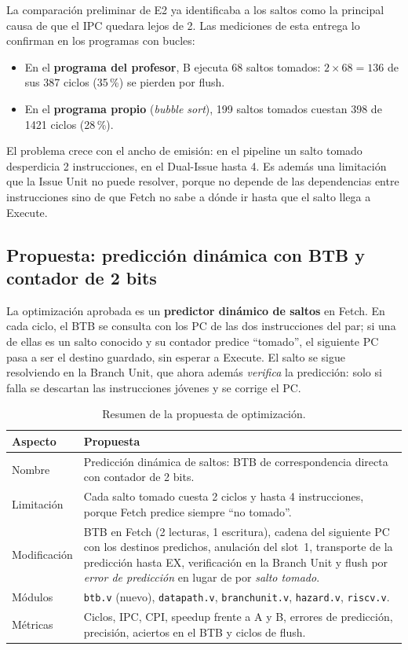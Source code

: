 \documentclass[12pt,a4paper]{article}
\begin{document}
La comparación preliminar de E2 ya identificaba a los saltos como la principal causa de que el IPC quedara lejos de 2. Las mediciones de esta entrega lo confirman en los programas con bucles:

\begin{itemize}
    \item En el \textbf{programa del profesor}, B ejecuta 68 saltos tomados: $2 \times 68 = 136$ de sus 387 ciclos (35\,\%) se pierden por flush.
    \item En el \textbf{programa propio} (\textit{bubble sort}), 199 saltos tomados cuestan 398 de 1421 ciclos (28\,\%).
\end{itemize}

\noindent El problema crece con el ancho de emisión: en el pipeline un salto tomado desperdicia 2 instrucciones, en el Dual-Issue hasta 4. Es además una limitación que la Issue Unit no puede resolver, porque no depende de las dependencias entre instrucciones sino de que Fetch no sabe a dónde ir hasta que el salto llega a Execute.

\subsection{Propuesta: predicción dinámica con BTB y contador de 2 bits}

La optimización aprobada es un \textbf{predictor dinámico de saltos} en Fetch. En cada ciclo, el BTB se consulta con los PC de las dos instrucciones del par; si una de ellas es un salto conocido y su contador predice ``tomado'', el siguiente PC pasa a ser el destino guardado, sin esperar a Execute. El salto se sigue resolviendo en la Branch Unit, que ahora además \emph{verifica} la predicción: solo si falla se descartan las instrucciones jóvenes y se corrige el PC.

\begin{table}[H]
\centering
\small
\begin{tabularx}{\linewidth}{lX}
\toprule
\textbf{Aspecto} & \textbf{Propuesta} \\
\midrule
Nombre & Predicción dinámica de saltos: BTB de correspondencia directa con contador de 2 bits. \\
Limitación & Cada salto tomado cuesta 2 ciclos y hasta 4 instrucciones, porque Fetch predice siempre ``no tomado''. \\
Modificación & BTB en Fetch (2 lecturas, 1 escritura), cadena del siguiente PC con los destinos predichos, anulación del slot~1, transporte de la predicción hasta EX, verificación en la Branch Unit y flush por \emph{error de predicción} en lugar de por \emph{salto tomado}. \\
Módulos & \texttt{btb.v} (nuevo), \texttt{datapath.v}, \texttt{branchunit.v}, \texttt{hazard.v}, \texttt{riscv.v}. \\
Métricas & Ciclos, IPC, CPI, speedup frente a A y B, errores de predicción, precisión, aciertos en el BTB y ciclos de flush. \\
\bottomrule
\end{tabularx}
\caption{Resumen de la propuesta de optimización.}
\label{tab:propuesta}
\end{table}
\end{document}
